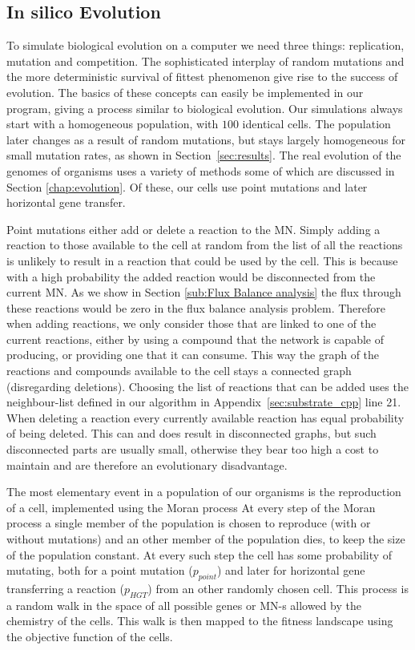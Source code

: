 \documentclass[a4paper,12pt]{article}
\begin{document}
\subsection{In silico Evolution}
\label{sub:implementing evolution}
To simulate biological evolution on a computer we need three things: replication, mutation and competition. The sophisticated interplay of random mutations and the more deterministic survival of fittest phenomenon give rise to the success of evolution. The basics of these concepts can easily be implemented in our program, giving a process similar to biological evolution. Our simulations always start with a homogeneous population, with $100$ identical cells. The population later changes as a result of random mutations, but stays largely homogeneous for small mutation rates, as shown in Section~\ref{sec:results}. The real evolution of the genomes of organisms uses a variety of methods some of which are discussed in Section \ref{chap:evolution}. Of these, our cells use point mutations and later horizontal gene transfer.
	
	Point mutations either add or delete a reaction to the MN. Simply adding a reaction to those available to the cell at random from the list of all the reactions is unlikely to result in a reaction that could be used by the cell. This is because with a high probability the added reaction would be disconnected from the current MN. As we show in Section \ref{sub:Flux Balance analysis} the flux through these reactions would be zero in the flux balance analysis problem. Therefore when adding reactions, we only consider those that are linked to one of the current reactions, either by using a compound that the network is capable of producing, or providing one that it can consume. %
	This way the graph of the reactions and compounds available to the cell stays a connected graph (disregarding deletions). Choosing the list of reactions that can be added uses the neighbour-list defined in our algorithm in Appendix~\ref{sec:substrate_cpp} line 21. When deleting a reaction every currently available reaction has equal probability of being deleted. This can and does result in disconnected graphs, but such disconnected parts are usually small, otherwise they bear too high a cost to maintain and are therefore an evolutionary disadvantage.
	
The most elementary event in a population of our organisms is the reproduction of a cell, implemented using the Moran process \cite{moranprocess} 
At every step of the Moran process a single member of the population is chosen to reproduce (with or without mutations) and an other member of the population dies, to keep the size of the population constant. At every such step the cell has some probability of mutating, both for a point mutation ($p_{point}$) and later for horizontal gene transferring a reaction ($p_{HGT}$) from an other randomly chosen cell. This process is a random walk in the space of all possible genes or MN-s allowed by the chemistry of the cells. This walk is then mapped to the fitness landscape using the objective function of the cells.
\end{document}
